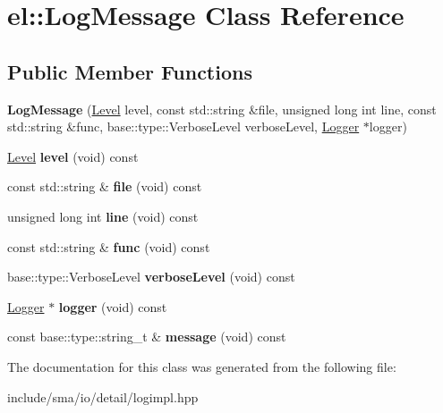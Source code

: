 \hypertarget{classel_1_1LogMessage}{\section{el\-:\-:Log\-Message Class Reference}
\label{classel_1_1LogMessage}
}
\subsection*{Public Member Functions}
\begin{DoxyCompactItemize}
\item 
\hypertarget{classel_1_1LogMessage_a6cb875167d28c57e11877f833d733e04}{{\bfseries Log\-Message} (\hyperlink{namespaceel_ab0ac6091262344c52dd2d3ad099e8e36}{Level} level, const std\-::string \&file, unsigned long int line, const std\-::string \&func, base\-::type\-::\-Verbose\-Level verbose\-Level, \hyperlink{classel_1_1Logger}{Logger} $\ast$logger)}\label{classel_1_1LogMessage_a6cb875167d28c57e11877f833d733e04}

\item 
\hypertarget{classel_1_1LogMessage_a09514a3bb7deae447c3141bc55b52d06}{\hyperlink{namespaceel_ab0ac6091262344c52dd2d3ad099e8e36}{Level} {\bfseries level} (void) const }\label{classel_1_1LogMessage_a09514a3bb7deae447c3141bc55b52d06}

\item 
\hypertarget{classel_1_1LogMessage_a8f72164d7bf31ea3b15a5c0201fca0c4}{const std\-::string \& {\bfseries file} (void) const }\label{classel_1_1LogMessage_a8f72164d7bf31ea3b15a5c0201fca0c4}

\item 
\hypertarget{classel_1_1LogMessage_a4bc97e6670d890cae719e3e9680b8373}{unsigned long int {\bfseries line} (void) const }\label{classel_1_1LogMessage_a4bc97e6670d890cae719e3e9680b8373}

\item 
\hypertarget{classel_1_1LogMessage_ae09cdff5620dcf8269b2b83bea722a2a}{const std\-::string \& {\bfseries func} (void) const }\label{classel_1_1LogMessage_ae09cdff5620dcf8269b2b83bea722a2a}

\item 
\hypertarget{classel_1_1LogMessage_a52e91b0dd3e5af96642622cc2a67aa88}{base\-::type\-::\-Verbose\-Level {\bfseries verbose\-Level} (void) const }\label{classel_1_1LogMessage_a52e91b0dd3e5af96642622cc2a67aa88}

\item 
\hypertarget{classel_1_1LogMessage_ae67b30a16a4115148ee32c9b2c91e03c}{\hyperlink{classel_1_1Logger}{Logger} $\ast$ {\bfseries logger} (void) const }\label{classel_1_1LogMessage_ae67b30a16a4115148ee32c9b2c91e03c}

\item 
\hypertarget{classel_1_1LogMessage_a0f34882ed8102061bb9bb247cb08a5c3}{const base\-::type\-::string\-\_\-t \& {\bfseries message} (void) const }\label{classel_1_1LogMessage_a0f34882ed8102061bb9bb247cb08a5c3}

\end{DoxyCompactItemize}


The documentation for this class was generated from the following file\-:\begin{DoxyCompactItemize}
\item 
include/sma/io/detail/logimpl.\-hpp\end{DoxyCompactItemize}

